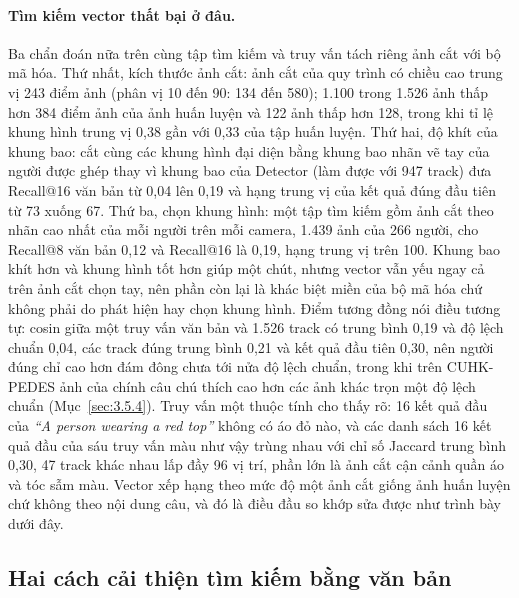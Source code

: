\paragraph{Tìm kiếm vector thất bại ở đâu.} Ba chẩn đoán nữa trên cùng tập tìm kiếm và truy vấn tách riêng ảnh cắt với bộ mã hóa. Thứ nhất, kích thước ảnh cắt: ảnh cắt của quy trình có chiều cao trung vị 243 điểm ảnh (phân vị 10 đến 90: 134 đến 580); 1.100 trong 1.526 ảnh thấp hơn 384 điểm ảnh của ảnh huấn luyện và 122 ảnh thấp hơn 128, trong khi tỉ lệ khung hình trung vị 0,38 gần với 0,33 của tập huấn luyện. Thứ hai, độ khít của khung bao: cắt cùng các khung hình đại diện bằng khung bao nhãn vẽ tay của người được ghép thay vì khung bao của Detector (làm được với 947 track) đưa Recall@16 văn bản từ 0,04 lên 0,19 và hạng trung vị của kết quả đúng đầu tiên từ 73 xuống 67. Thứ ba, chọn khung hình: một tập tìm kiếm gồm ảnh cắt theo nhãn cao nhất của mỗi người trên mỗi camera, 1.439 ảnh của 266 người, cho Recall@8 văn bản 0,12 và Recall@16 là 0,19, hạng trung vị trên 100. Khung bao khít hơn và khung hình tốt hơn giúp một chút, nhưng vector vẫn yếu ngay cả trên ảnh cắt chọn tay, nên phần còn lại là khác biệt miền của bộ mã hóa chứ không phải do phát hiện hay chọn khung hình. Điểm tương đồng nói điều tương tự: cosin giữa một truy vấn văn bản và 1.526 track có trung bình 0,19 và độ lệch chuẩn 0,04, các track đúng trung bình 0,21 và kết quả đầu tiên 0,30, nên người đúng chỉ cao hơn đám đông chưa tới nửa độ lệch chuẩn, trong khi trên CUHK-PEDES ảnh của chính câu chú thích cao hơn các ảnh khác trọn một độ lệch chuẩn (Mục~\ref{sec:3.5.4}). Truy vấn một thuộc tính cho thấy rõ: 16 kết quả đầu của \emph{``A person wearing a red top''} không có áo đỏ nào, và các danh sách 16 kết quả đầu của sáu truy vấn màu như vậy trùng nhau với chỉ số Jaccard trung bình 0,30, 47 track khác nhau lấp đầy 96 vị trí, phần lớn là ảnh cắt cận cảnh quần áo và tóc sẫm màu. Vector xếp hạng theo mức độ một ảnh cắt giống ảnh huấn luyện chứ không theo nội dung câu, và đó là điều đầu so khớp sửa được như trình bày dưới đây.

\subsection{Hai cách cải thiện tìm kiếm bằng văn bản}


